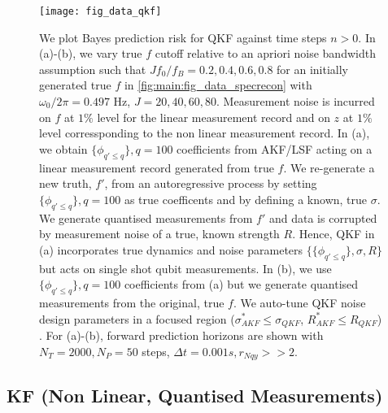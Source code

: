 \begin{figure}[h!]
    \texttt{[image: fig\_data\_qkf]}
    \caption{\label{fig:main:fig_data_qkf2} We plot Bayes prediction risk for QKF against time steps $n>0$. In (a)-(b), we vary true $f$ cutoff relative to an apriori noise bandwidth assumption such that $J f_0 / f_B = 0.2, 0.4, 0.6, 0.8$ for an initially generated true $f$ in \cref{fig:main:fig_data_specrecon} with $\omega_0/ 2\pi = 0.497 $ Hz, $J = 20, 40, 60, 80$. Measurement noise is incurred on $f$ at $1 \%$ level for the linear measurement record and on $z$ at $1\%$ level corressponding to the non linear measurement record. In (a), we obtain $\{\phi_{q' \leq q}\}, q=100$ coefficients from AKF/LSF acting on a linear measurement record generated from true $f$. We re-generate a new truth, $f'$, from an autoregressive process by setting $\{\phi_{q'\leq q}\}, q=100$ as true coefficents and by defining a known, true $\sigma$. We generate quantised measurements from $f'$ and data is corrupted by measurement noise of a true, known strength $R$. Hence, QKF in (a) incorporates true dynamics and noise parameters $\{\{\phi_{q' \leq q} \}, \sigma, R\}$ but acts on single shot qubit measurements. In (b), we use $\{\phi_{q' \leq q} \}, q=100$ coefficients from (a) but we generate quantised measurements from the original, true $f$. We auto-tune QKF noise design parameters in a focused region ($\sigma_{AKF}^* \leq \sigma_{QKF}$, $R_{AKF}^* \leq R_{QKF}$) . For (a)-(b), forward prediction horizons are shown with $N_T = 2000, N_P = 50$ steps, $\Delta t = 0.001s, r_{Nqy}>> 2$.}
\end{figure}

\subsection{KF (Non Linear, Quantised Measurements)}


